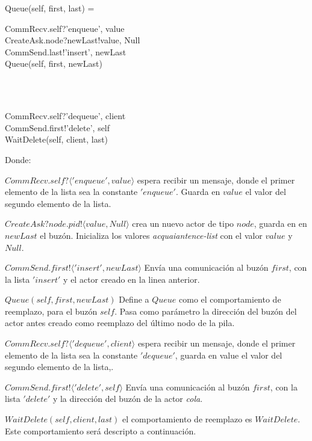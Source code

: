 \begin{process}
Queue(self, first, last) = \\ \quad
  \begin{block}
  CommRecv.self?\langle 'enqueue', value \rangle \then \\
  CreateAsk.node?newLast!\langle value, Null \rangle \then \\
  CommSend.last!\langle 'insert', newLast \rangle \then \\
  Queue(self, first, newLast)
  \end{block} \\

  \Extchoice \\ \quad
  
  \begin{block}
  CommRecv.self?\langle 'dequeue', client \rangle \then \\
  CommSend.first!\langle 'delete', self \rangle \then \\
  WaitDelete(self, client, last)
  \end{block} 
\end{process}

Donde:

\begin{description}
 \item $CommRecv.self? \langle 'enqueue', value \rangle$ espera recibir un mensaje, donde el primer elemento de la lista sea la constante $'enqueue'$. Guarda en $value$ el valor del segundo elemento de la lista.
 \item $CreateAsk?node.pid!\langle value, Null \rangle$ crea un nuevo actor de tipo $node$, guarda en en $newLast$ el buzón. Inicializa los valores \textit{acquaiantence-list} con el valor $value$ y $Null$.
 \item $CommSend.first!\langle 'insert', newLast \rangle$ Envía una comunicación al buzón $first$, con la lista $'insert'$ y el actor creado en la linea anterior. 
 \item $Queue(self, first, newLast)$ Define a $Queue$ como el comportamiento de reemplazo, para el buzón $self$. Pasa como parámetro la dirección del buzón del actor antes creado como reemplazo del último nodo de la pila.
 \item $CommRecv.self?\langle 'dequeue', client \rangle$ espera recibir un mensaje, donde el primer elemento de la lista sea la constante $'dequeue'$, guarda en value el valor del segundo elemento de la lista,.
 \item $CommSend.first!\langle 'delete', self \rangle$ Envía una comunicación al buzón $first$, con la lista $'delete'$ y la dirección del buzón de la actor \textit{cola}. 
 \item $WaitDelete(self, client, last)$ el comportamiento de reemplazo es $WaitDelete$. Este comportamiento será descripto a continuación.
 \end{description}

